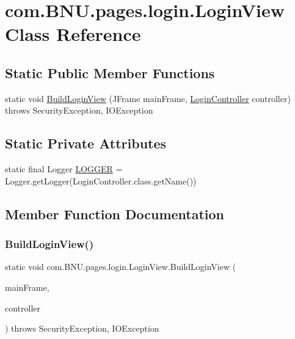 \hypertarget{classcom_1_1_b_n_u_1_1pages_1_1login_1_1_login_view}{}\section{com.\+B\+N\+U.\+pages.\+login.\+Login\+View Class Reference}
\label{classcom_1_1_b_n_u_1_1pages_1_1login_1_1_login_view}
\subsection*{Static Public Member Functions}
\begin{DoxyCompactItemize}
\item 
static void \mbox{\hyperlink{classcom_1_1_b_n_u_1_1pages_1_1login_1_1_login_view_a5a3d75dc2f3dec440d447ae66549b3e9}{Build\+Login\+View}} (J\+Frame main\+Frame, \mbox{\hyperlink{classcom_1_1_b_n_u_1_1pages_1_1login_1_1_login_controller}{Login\+Controller}} controller)  throws Security\+Exception, I\+O\+Exception 
\end{DoxyCompactItemize}
\subsection*{Static Private Attributes}
\begin{DoxyCompactItemize}
\item 
static final Logger \mbox{\hyperlink{classcom_1_1_b_n_u_1_1pages_1_1login_1_1_login_view_a2e31cefa39790a078ae4fe23ba4ae2cd}{L\+O\+G\+G\+ER}} = Logger.\+get\+Logger(Login\+Controller.\+class.\+get\+Name())
\end{DoxyCompactItemize}


\subsection{Member Function Documentation}
\mbox{\label{classcom_1_1_b_n_u_1_1pages_1_1login_1_1_login_view_a5a3d75dc2f3dec440d447ae66549b3e9}} 
\subsubsection{\texorpdfstring{Build\+Login\+View()}{BuildLoginView()}}
{\footnotesize\ttfamily static void com.\+B\+N\+U.\+pages.\+login.\+Login\+View.\+Build\+Login\+View (\begin{DoxyParamCaption}\item[{J\+Frame}]{main\+Frame,  }\item[{\mbox{\hyperlink{classcom_1_1_b_n_u_1_1pages_1_1login_1_1_login_controller}{Login\+Controller}}}]{controller }\end{DoxyParamCaption}) throws Security\+Exception, I\+O\+Exception\hspace{0.3cm}{\ttfamily [static]}}

